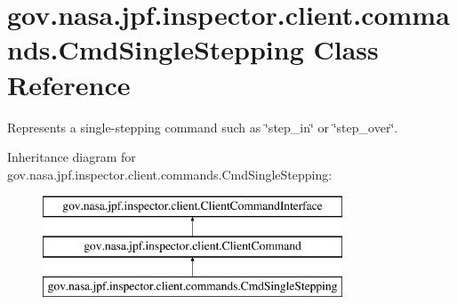 \hypertarget{classgov_1_1nasa_1_1jpf_1_1inspector_1_1client_1_1commands_1_1_cmd_single_stepping}{}\section{gov.\+nasa.\+jpf.\+inspector.\+client.\+commands.\+Cmd\+Single\+Stepping Class Reference}
\label{classgov_1_1nasa_1_1jpf_1_1inspector_1_1client_1_1commands_1_1_cmd_single_stepping}


Represents a single-\/stepping command such as \char`\"{}step\+\_\+in\char`\"{} or \char`\"{}step\+\_\+over\char`\"{}.  


Inheritance diagram for gov.\+nasa.\+jpf.\+inspector.\+client.\+commands.\+Cmd\+Single\+Stepping\+:\begin{figure}[H]
\begin{center}
\leavevmode
\includegraphics[height=3.000000cm]{classgov_1_1nasa_1_1jpf_1_1inspector_1_1client_1_1commands_1_1_cmd_single_stepping}
\end{center}
\end{figure}
